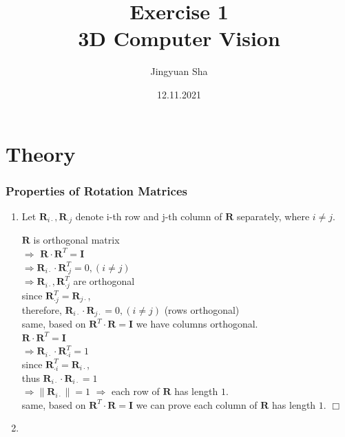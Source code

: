 \documentclass[a4paper, twoside, english]{article}
\title{Exercise 1 \\ 3D Computer Vision}  %
\author{Jingyuan Sha}                       %
\date{12.11.2021}                              %
\newcommand{\br}{\textbf{R}}
\newcommand{\qed}{\hfill \ensuremath{\Box}}
\begin{document}
\maketitle

\part{Theory}

\section{Properties of Rotation Matrices}

\begin{enumerate}
	\item Let   $ \br_{i\cdot}, \br_{\cdot j}$ denote i-th row and j-th column of $ \br $ separately, where $ i\neq j $. 
	
	$ \br $ is orthogonal matrix \\
	$\Rightarrow$ $ \br \cdot \br^T =  \textbf{I} $\\
	$ \Rightarrow \br_{i\cdot} \cdot \br_{\cdot j}^T = 0, (i\neq j) $\\
	$ \Rightarrow \br_{i\cdot}, \br_{\cdot j}^T $ are orthogonal\\
	since $ \br_{\cdot j}^T = \br_{j \cdot} $,\\
	therefore, $ \br_{i\cdot} \cdot \br_{j \cdot} = 0, (i\neq j) $ (rows orthogonal)\\
	same, based on $ \br^T \cdot \br =  \textbf{I} $ we have columns orthogonal.\\
	
	$ \br \cdot \br^T = \textbf{I} $\\
	$ \Rightarrow \br_{i\cdot} \cdot \br_{\cdot i}^T = 1$\\
	since $ \br_{\cdot i}^T = \br_{i\cdot} $, \\
	thus $ \br_{i\cdot} \cdot \br_{i\cdot} = 1  $\\
	$ \Rightarrow \| \br_{i\cdot}  \| = 1 $ $ \Rightarrow $ each row of $ \br $ has length $ 1 $.\\
	same, based on  $ \br^T \cdot \br =  \textbf{I} $ we can prove each column of $ \br $ has length $ 1 $. \qed
	
	\item
	

\end{enumerate}
\end{document}
